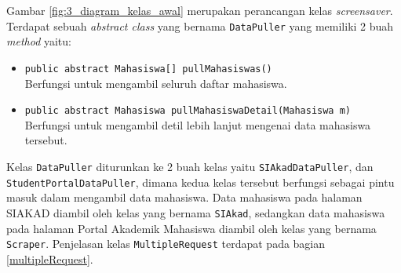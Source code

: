 Gambar \ref{fig:3_diagram_kelas_awal} merupakan perancangan kelas \textit{screensaver}. Terdapat sebuah \textit{abstract class} yang bernama \texttt{DataPuller} yang memiliki 2 buah \textit{method} yaitu:
\begin{itemize}
	\item \texttt{public abstract Mahasiswa[] pullMahasiswas()}\\
        Berfungsi untuk mengambil seluruh daftar mahasiswa.
	\item \texttt{public abstract Mahasiswa pullMahasiswaDetail(Mahasiswa m)}\\
	    Berfungsi untuk mengambil detil lebih lanjut mengenai data mahasiswa tersebut.
\end{itemize}
Kelas \texttt{DataPuller} diturunkan ke 2 buah kelas yaitu \texttt{SIAkadDataPuller}, dan \texttt{StudentPortalDataPuller}, dimana kedua kelas tersebut berfungsi sebagai pintu masuk dalam mengambil data mahasiswa. Data mahasiswa pada halaman SIAKAD diambil oleh kelas yang bernama \texttt{SIAkad}, sedangkan data mahasiswa pada halaman Portal Akademik Mahasiswa diambil oleh kelas yang bernama \texttt{Scraper}. Penjelasan kelas \texttt{MultipleRequest} terdapat pada bagian \ref{multipleRequest}.